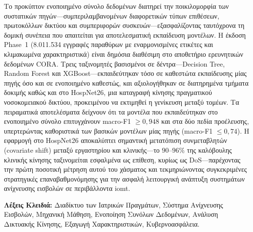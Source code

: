 Το προκύπτον ενοποιημένο σύνολο δεδομένων διατηρεί την ποικιλομορφία των
συστατικών πηγών---συμπεριλαμβανομένων διαφορετικών τύπων επιθέσεων, πρωτοκόλλων
δικτύου και συμπεριφορών συσκευών---εξασφαλίζοντας ταυτόχρονα τη δομική συνέπεια
που απαιτείται για αποτελεσματική εκπαίδευση μοντέλων. Η έκδοση Phase~1
(8.011.534 εγγραφές παραθύρων με εναρμονισμένες ετικέτες και κλιμακωμένα
χαρακτηριστικά) είναι δημόσια διαθέσιμη στο αποθετήριο ερευνητικών δεδομένων CORA.
Τρεις ταξινομητές βασισμένοι σε δέντρα---Decision Tree, Random Forest και
XGBoost---εκπαιδεύτηκαν τόσο σε καθεστώτα εκπαίδευσης μίας πηγής όσο και σε
ενοποιημένο καθεστώς, και αξιολογήθηκαν σε διατηρημένα τμήματα δοκιμής καθώς και
στο HospNet26, μια καταγραφή κίνησης πραγματικού νοσοκομειακού δικτύου, προκειμένου
να εκτιμηθεί η γενίκευση μεταξύ τομέων. Τα πειραματικά αποτελέσματα δείχνουν ότι
τα μοντέλα που εκπαιδεύτηκαν στο ενοποιημένο σύνολο επιτυγχάνουν macro-F1
$\geq 0{,}948$ και στα δύο πεδία προέλευσης, υπερτερώντας καθοριστικά των βασικών
μοντέλων μίας πηγής (macro-F1 $\leq 0{,}74$). Η εφαρμογή στο HospNet26 αποκαλύπτει
σημαντική μετατόπιση συνμεταβλητών (covariate shift) μεταξύ εργαστηρίου και
κλινικής---το $90$--$96\%$ της καλόβουλης κλινικής κίνησης ταξινομείται εσφαλμένα
ως επίθεση, κυρίως ως DoS---παρέχοντας την πρώτη ποσοτική μέτρηση αυτού του χάσματος
και τεκμηριώνοντας συγκεκριμένες στρατηγικές επαναβαθμονόμησης για την ασφαλή
λειτουργική ανάπτυξη συστημάτων ανίχνευσης εισβολών σε περιβάλλοντα \gls{iomt}.

\bigskip
\noindent\textbf{Λέξεις Κλειδιά:} Διαδίκτυο των Ιατρικών Πραγμάτων, Σύστημα Ανίχνευσης Εισβολών, Μηχανική Μάθηση, Ενοποίηση Συνόλων Δεδομένων, Ανάλυση Δικτυακής Κίνησης, Εξαγωγή Χαρακτηριστικών, Κυβερνοασφάλεια.
